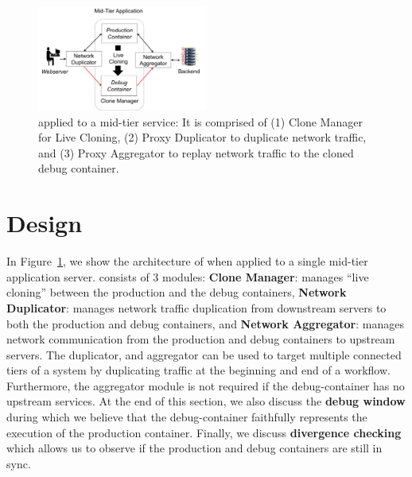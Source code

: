 
\begin{figure}[ht]
	\begin{center}
		\includegraphics[width=0.5\textwidth]{figs/arch.png}
		\caption{\parikshan applied to a mid-tier service: It is comprised of (1) Clone Manager for Live Cloning, (2) Proxy Duplicator to duplicate network traffic, and (3) Proxy Aggregator to replay network traffic to the cloned debug container.}
		\label{fig:workflow}
	\end{center}
\end{figure}

\vspace{-1cm}
\section{Design}
\label{sec:design}

In Figure~\ref{fig:workflow}, we show the architecture of \parikshan when applied to a single mid-tier application server.
\parikshan consists of 3 modules: 
\textbf{Clone Manager}: manages ``live cloning'' between the production and the debug containers, 
\textbf{Network Duplicator}: manages network traffic duplication from downstream servers to both the production and debug containers, 
and \textbf{Network Aggregator}: manages network communication from the production and debug containers to upstream servers.
The duplicator, and aggregator can be used to target multiple connected tiers of a system by duplicating traffic at the beginning and end of a workflow.
Furthermore, the aggregator module is not required if the debug-container has no upstream services. 
At the end of this section, we also discuss the \textbf{debug window} during which we believe that the debug-container faithfully represents the execution of the production container.
Finally, we discuss \textbf{divergence checking} which allows us to observe if the production and debug containers are still in sync.

